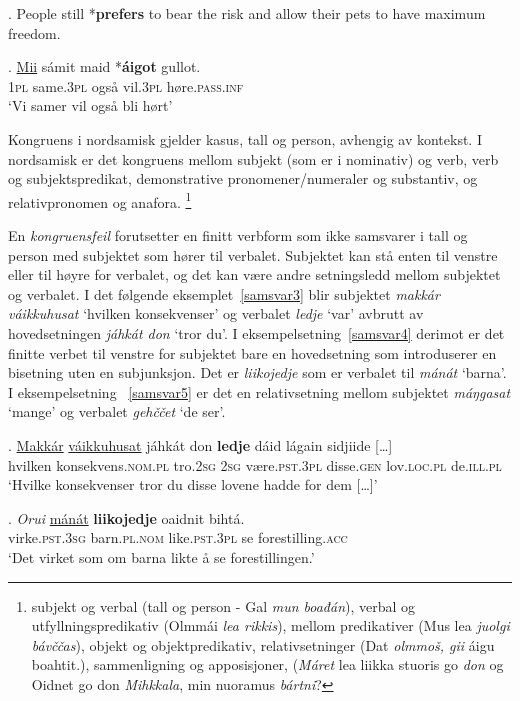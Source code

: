 \documentclass{flammie}
\begin{document}
\ex. People still *\textbf{prefers} to bear the risk and allow their pets to have maximum freedom.\label{samsvar1}

\exg. \underline{Mii} sámit maid *\textbf{áigot} gullot.\label{samsvar2}\\
\textsc{1pl} same\textsc{.3pl} også vil\textsc{.3pl} høre\textsc{.pass.inf}\\
`Vi samer vil også bli hørt'

Kongruens i nordsamisk gjelder kasus, tall og person, avhengig av kontekst.  I
nordsamisk er det kongruens mellom subjekt (som er i nominativ) og verb, verb og
subjektspredikat, demonstrative pronomener/numeraler og substantiv, og
relativpronomen og anafora. \cite[s.509ff.]{Nickel1994}\footnote{subjekt og
verbal (tall og person - Gal \textit{mun boađán}), verbal og
utfyllningspredikativ (Olmmái \textit{lea rikkis}), mellom predikativer (Mus lea
\textit{juolgi bávččas}), objekt og objektpredikativ, relativsetninger (Dat
\textit{olmmoš, gii} áigu boahtit.), sammenligning og apposisjoner,
(\textit{Máret} lea liikka stuoris go \textit{don} og Oidnet go don
\textit{Mihkkala}, min nuoramus \textit{bártni}?}

En \textit{kongruensfeil} forutsetter en finitt verbform som ikke samsvarer i
tall og person med subjektet som hører til verbalet. Subjektet kan stå enten til
venstre eller til høyre for verbalet, og det kan være andre setningsledd mellom
subjektet og verbalet.  I det følgende eksemplet~\ref{samsvar3} blir subjektet
\textit{makkár váikkuhusat} `hvilken konsekvenser' og verbalet \textit{ledje}
`var' avbrutt av hovedsetningen \textit{jáhkát don} `tror du'. I
eksempelsetning~\ref{samsvar4} derimot er det finitte verbet til venstre for
subjektet bare en hovedsetning som introduserer en bisetning uten en
subjunksjon. Det er \textit{liikojedje} som er verbalet til \textit{mánát}
`barna'.  I eksempelsetning ~\ref{samsvar5} er det en relativsetning mellom
subjektet \textit{máŋgasat} `mange' og verbalet \textit{gehččet} `de ser'.

\exg. \underline{Makkár} \underline{váikkuhusat} jáhkát don \textbf{ledje} dáid lágain sidjiide [\ldots]\label{samsvar3}\\
hvilken konsekvens\textsc{.nom.pl} tro\textsc{.2sg} \textsc{2sg} være\textsc{.pst.3pl} disse\textsc{.gen} lov\textsc{.loc.pl} de\textsc{.ill.pl}\\
`Hvilke konsekvenser tror du disse lovene hadde for dem [\ldots]'

\exg. \textit{Orui} \underline{mánát} \textbf{liikojedje} oaidnit bihtá.\label{samsvar4}\\
virke\textsc{.pst.3sg} barn\textsc{.pl.nom} like\textsc{.pst.3pl} se forestilling\textsc{.acc}\\
`Det virket som om barna likte å se forestillingen.'
\end{document}
